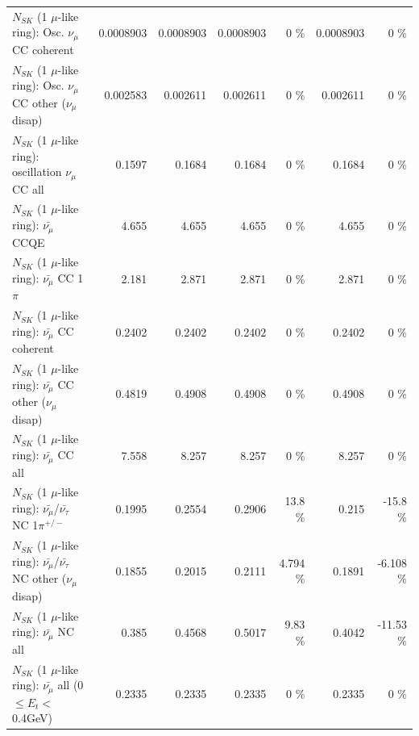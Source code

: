\begin{table}
\begin{tabular}{| l | r | r | r  r | r  r |}
                        $N_{SK}$ (1 $\mu$-like ring): Osc. $\nu_\mu$ CC coherent &       0.0008903 &       0.0008903 &       0.0008903 &        0 \%  &       0.0008903 &        0 \%  \\ 
         $N_{SK}$ (1 $\mu$-like ring): Osc. $\nu_\mu$ CC other ($\nu_\mu$ disap) &        0.002583 &        0.002611 &        0.002611 &        0 \%  &        0.002611 &        0 \%  \\ 
                      $N_{SK}$ (1 $\mu$-like ring): oscillation $\nu_\mu$ CC all &          0.1597 &          0.1684 &          0.1684 &        0 \%  &          0.1684 &        0 \%  \\ 
\hline
\hline
                              $N_{SK}$ (1 $\mu$-like ring): $\bar{\nu_\mu}$ CCQE &           4.655 &           4.655 &           4.655 &        0 \%  &           4.655 &        0 \%  \\ 
                         $N_{SK}$ (1 $\mu$-like ring): $\bar{\nu_\mu}$ CC 1$\pi$ &           2.181 &           2.871 &           2.871 &        0 \%  &           2.871 &        0 \%  \\ 
                       $N_{SK}$ (1 $\mu$-like ring): $\bar{\nu_\mu}$ CC coherent &          0.2402 &          0.2402 &          0.2402 &        0 \%  &          0.2402 &        0 \%  \\ 
        $N_{SK}$ (1 $\mu$-like ring): $\bar{\nu_\mu}$ CC other ($\nu_\mu$ disap) &          0.4819 &          0.4908 &          0.4908 &        0 \%  &          0.4908 &        0 \%  \\ 
                          $N_{SK}$ (1 $\mu$-like ring): $\bar{\nu_{\mu}}$ CC all &           7.558 &           8.257 &           8.257 &        0 \%  &           8.257 &        0 \%  \\ 
\hline
  $N_{SK}$ (1 $\mu$-like ring): $\bar{\nu_\mu}$/$\bar{\nu_\tau}$ NC 1$\pi^{+/-}$ &          0.1995 &          0.2554 &          0.2906 &     13.8 \%  &           0.215 &    -15.8 \%  \\ 
$N_{SK}$ (1 $\mu$-like ring): $\bar{\nu_\mu}$/$\bar{\nu_\tau}$ NC other ($\nu_\mu$ disap) &          0.1855 &          0.2015 &          0.2111 &    4.794 \%  &          0.1891 &   -6.108 \%  \\ 
                          $N_{SK}$ (1 $\mu$-like ring): $\bar{\nu_{\mu}}$ NC all &           0.385 &          0.4568 &          0.5017 &     9.83 \%  &          0.4042 &   -11.53 \%  \\ 
\hline
   $N_{SK}$ (1 $\mu$-like ring): $\bar{\nu_{\mu}}$ all (0 $\leq E_{t} <$ 0.4GeV) &          0.2335 &          0.2335 &          0.2335 &        0 \%  &          0.2335 &        0 \%  \\ 

\end{tabular}
\end{table}
